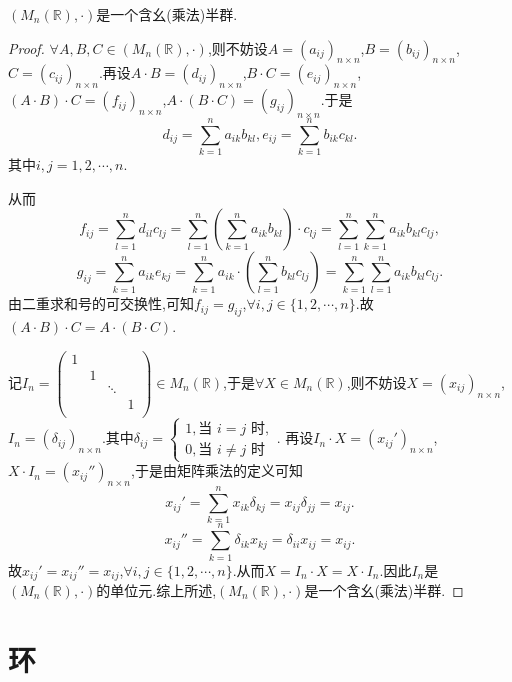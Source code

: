 \documentclass[lang=cn,newtx,10pt,scheme=chinese]{../Template/elegantbook}
\begin{document}
\begin{example}
$\left( M_n\left( \mathbb{R} \right) ,\cdot \right)$是一个含幺(乘法)半群.
\end{example}
\begin{proof}
\(\forall A,B,C\in (M_n(\mathbb{R}),\cdot)\),则不妨设\(A=(a_{ij})_{n\times n}\),\(B=(b_{ij})_{n\times n}\),\(C=(c_{ij})_{n\times n}\).再设\(A\cdot B=(d_{ij})_{n\times n}\),\(B\cdot C=(e_{ij})_{n\times n}\),\((A\cdot B)\cdot C=(f_{ij})_{n\times n}\),\(A\cdot (B\cdot C)=(g_{ij})_{n\times n}\).于是
\[
d_{ij}=\sum_{k = 1}^n{a_{ik}b_{kl}},e_{ij}=\sum_{k = 1}^n{b_{ik}c_{kl}}.
\]
其中\(i,j = 1,2,\cdots,n\).

从而
\[
f_{ij}=\sum_{l = 1}^n{d_{il}c_{lj}}=\sum_{l = 1}^n{\left(\sum_{k = 1}^n{a_{ik}b_{kl}}\right)\cdot c_{lj}}=\sum_{l = 1}^n{\sum_{k = 1}^n{a_{ik}b_{kl}c_{lj}}},
\]
\[
g_{ij}=\sum_{k = 1}^n{a_{ik}e_{kj}}=\sum_{k = 1}^n{a_{ik}\cdot\left(\sum_{l = 1}^n{b_{kl}c_{lj}}\right)}=\sum_{k = 1}^n{\sum_{l = 1}^n{a_{ik}b_{kl}c_{lj}}}.
\]
由二重求和号的可交换性,可知\(f_{ij}=g_{ij}\),\(\forall i,j\in \{1,2,\cdots,n\}\).故\((A\cdot B)\cdot C = A\cdot (B\cdot C)\).

记\(I_n=\begin{pmatrix}
1 & & & \\
& 1 & & \\
& & \ddots & \\
& & & 1\\
\end{pmatrix}\in M_n(\mathbb{R})\),于是\(\forall X\in M_n(\mathbb{R})\),则不妨设\(X=(x_{ij})_{n\times n}\),\(I_n = (\delta_{ij})_{n\times n}\).其中\(\delta_{ij}=\begin{cases}
1,\text{当 }i = j\text{ 时},\\
0,\text{当 }i\neq j\text{ 时}
\end{cases}\).
再设\(I_n\cdot X=(x_{ij}')_{n\times n}\),\(X\cdot I_n=(x_{ij}'')_{n\times n}\),于是由矩阵乘法的定义可知
\[
x_{ij}'=\sum_{k = 1}^n{x_{ik}\delta_{kj}}=x_{ij}\delta_{jj}=x_{ij}.
\]
\[
x_{ij}''=\sum_{k = 1}^n{\delta_{ik}x_{kj}}=\delta_{ii}x_{ij}=x_{ij}.
\]
故\(x_{ij}'=x_{ij}''=x_{ij}\),\(\forall i,j\in \{1,2,\cdots,n\}\).从而\(X = I_n\cdot X = X\cdot I_n\).因此\(I_n\)是\((M_n(\mathbb{R}),\cdot)\)的单位元.综上所述,$\left( M_n\left( \mathbb{R} \right) ,\cdot \right)$是一个含幺(乘法)半群.
\end{proof}


\begin{definition}

\end{definition}


\chapter{环}
\end{document}
